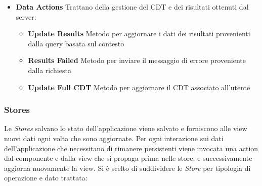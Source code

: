 \begin{itemize}
\begin{itemize}
	\end{itemize}
	\item \textbf{Data Actions}
	Trattano della gestione del CDT e dei risultati ottenuti dal server:
	\begin{itemize}
		\item \textbf{Update Results}
		Metodo per aggiornare i dati dei risultati provenienti dalla query basata sul contesto
		\item \textbf{Results Failed}
		Metodo per inviare il messaggio di errore proveniente dalla richiesta
		\item \textbf{Update Full CDT}
		Metodo per aggiornare il CDT associato all'utente
	\end{itemize}
\end{itemize}

\subsubsection{Stores\label{sec:action-store}}

Le \emph{Stores} salvano lo stato dell'applicazione viene salvato e forniscono alle view nuovi dati ogni volta che sono aggiornate. 
Per ogni interazione sui dati dell'applicazione che necessitano di rimanere persistenti viene invocata una action dal componente e dalla view che si propaga prima nelle store, e successivamente aggiorna nuovamente la view.
Si è scelto di suddividere le \emph{Store} per tipologia di operazione e dato trattata:

